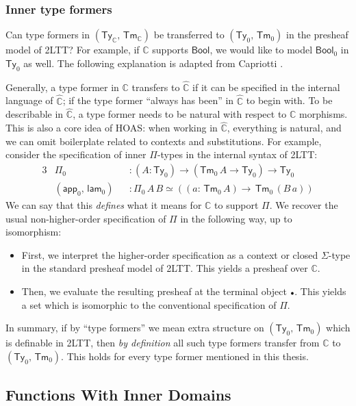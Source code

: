 \documentclass[12pt,a4paper,twoside,openany]{book}
\theoremstyle{remark}
\theoremstyle{definition}
\theoremstyle{theorem}
\newcommand{\ms}[1]{\mathsf{#1}}
\newcommand{\mbb}[1]{\mathbb{#1}}
\newcommand{\Tm}{\mathsf{Tm}}
\newcommand{\Ty}{\mathsf{Ty}}
\newcommand{\emptycon}{\scaleobj{.75}\bullet}
\newcommand{\app}{\ms{app}}
\newcommand{\Bool}{\ms{Bool}}
\newcommand{\mbbC}{\mbb{C}}
\newcommand{\hmbbC}{\hat{\mbb{C}}}
\newcommand{\lam}{\ms{lam}}
\begin{document}
\subsubsection{Inner type formers}

Can type formers in $(\Ty_{\mbbC},\,\Tm_{\mbbC})$ be transferred to
$(\Ty_0,\,\Tm_0)$ in the presheaf model of 2LTT? For example, if $\mbbC$
supports $\Bool$, we would like to model $\Bool_0$ in $\Ty_0$ as well. The
following explanation is adapted from Capriotti \cite[Section
  2.3]{capriotti2017models}.

Generally, a type former in $\mbbC$ transfers to $\hmbbC$ if it can be specified
in the internal language of $\hmbbC$; if the type former ``always has been'' in
$\hmbbC$ to begin with. To be describable in $\hmbbC$, a type former needs to be
natural with respect to $\mbbC$ morphisms. This is also a core idea of HOAS:
when working in $\hmbbC$, everything is natural, and we can omit boilerplate
related to contexts and substitutions. For example, consider the specification
of inner $\Pi$-types in the internal syntax of 2LTT:
\begin{alignat*}{3}
  &\Pi_0             &&: (A : \Ty_0) \to (\Tm_0\,A \to \Ty_0) \to \Ty_0\\
  &(\app_0,\,\lam_0) &&: \Pi_0\,A\,B \simeq ((a :\,\Tm_0\,A) \to \,\Tm_0\,(B\,a))
\end{alignat*}
We can say that this \emph{defines} what it means for $\mbbC$ to support
$\Pi$. We recover the usual non-higher-order specification of $\Pi$ in the
following way, up to isomorphism:
\begin{itemize}
\item First, we interpret the higher-order specification as a context or closed $\Sigma$-type
      in the standard presheaf model of 2LTT. This yields a presheaf over $\mbbC$.
\item Then, we evaluate the resulting presheaf at the terminal object
      $\emptycon$. This yields a set which is isomorphic to the conventional
      specification of $\Pi$.
\end{itemize}

In summary, if by ``type formers'' we mean extra structure on $(\Ty_0,\,\Tm_0)$
which is definable in 2LTT, then \emph{by definition} all such type formers
transfer from $\mbbC$ to $(\Ty_0,\,\Tm_0)$. This holds for every type former
mentioned in this thesis.

\subsection{Functions With Inner Domains}
\label{sec:functions-with-inner-domains}
\end{document}
